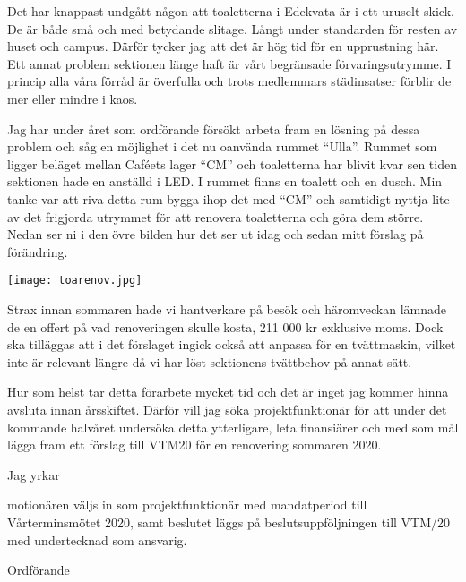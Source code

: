 \documentclass[../_main/handlingar.tex]{subfiles}
\begin{document}

Det har knappast undgått någon att toaletterna i Edekvata är i ett uruselt skick. De är både små och med betydande slitage. Långt under standarden för resten av huset och campus. 
Därför tycker jag att det är hög tid för en upprustning här. Ett annat problem sektionen länge haft är vårt begränsade förvaringsutrymme. I princip alla våra förråd är överfulla och trots medlemmars städinsatser förblir de mer eller mindre i kaos. 

Jag har under året som ordförande försökt arbeta fram en lösning på dessa problem och såg en möjlighet i det nu oanvända rummet “Ulla”. Rummet som ligger beläget mellan Caféets lager “CM” och toaletterna har blivit kvar sen tiden sektionen hade en anställd i LED. I rummet finns en toalett och en dusch. Min tanke var att riva detta rum bygga ihop det med “CM” och samtidigt nyttja lite av det frigjorda utrymmet för att renovera toaletterna och göra dem större. Nedan ser ni i den övre bilden hur det ser ut idag och sedan mitt förslag på förändring. 

\begin{center}
    \texttt{[image: toarenov.jpg]}
\end{center}

\newpage  
Strax innan sommaren hade vi hantverkare på besök och häromveckan lämnade de en offert på vad renoveringen skulle kosta, 211 000 kr exklusive moms. Dock ska tilläggas att i det förslaget ingick också att anpassa för en tvättmaskin, vilket inte är relevant längre då vi har löst sektionens tvättbehov på annat sätt. 

Hur som helst tar detta förarbete mycket tid och det är inget jag kommer hinna avsluta innan årsskiftet. Därför vill jag söka projektfunktionär för att under det kommande halvåret undersöka detta ytterligare, leta finansiärer och med som mål lägga fram ett förslag till VTM20 för en renovering sommaren 2020.
  
Jag yrkar

\begin{attsatser}
    \att motionären väljs in som projektfunktionär med mandatperiod till Vårterminsmötet 2020, samt 
    \att beslutet läggs på beslutsuppföljningen till VTM/20 med undertecknad som ansvarig.
    
\end{attsatser}

\begin{signatures}{1}
    \isekt
    \signature{Edvard Carlsson}{Ordförande}
\end{signatures}
\end{document}
